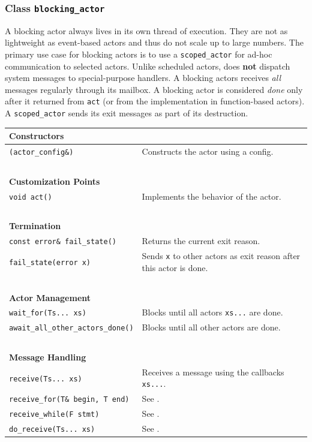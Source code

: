 \clearpage
\subsubsection{Class \lstinline^blocking_actor^}

A blocking actor always lives in its own thread of execution. They are not as lightweight as event-based actors and thus do not scale up to large numbers. The primary use case for blocking actors is to use a \lstinline^scoped_actor^ for ad-hoc communication to selected actors. Unlike scheduled actors, \lib does \textbf{not} dispatch system messages to special-purpose handlers. A blocking actors receives \emph{all} messages regularly through its mailbox. A blocking actor is considered \emph{done} only after it returned from \lstinline^act^ (or from the implementation in function-based actors). A \lstinline^scoped_actor^ sends its exit messages as part of its destruction.

\begin{center}
\small
\begin{tabular}{ll}
  \textbf{Constructors} & ~ \\
  \hline
  \lstinline^(actor_config&)^ & Constructs the actor using a config. \\
  \hline
  ~ & ~ \\ \textbf{Customization Points} & ~ \\
  \hline
  \lstinline^void act()^ & Implements the behavior of the actor. \\
  \hline
  ~ & ~ \\ \textbf{Termination} & ~ \\
  \hline
  \lstinline^const error& fail_state()^ & Returns the current exit reason. \\
  \hline
  \lstinline^fail_state(error x)^ & Sends \lstinline^x^ to other actors as exit reason after this actor is done. \\
  \hline
  ~ & ~ \\ \textbf{Actor Management} & ~ \\
  \hline
  \lstinline^wait_for(Ts... xs)^ & Blocks until all actors \lstinline^xs...^ are done. \\
  \hline
  \lstinline^await_all_other_actors_done()^ & Blocks until all other actors are done. \\
  \hline
  ~ & ~ \\ \textbf{Message Handling} & ~ \\
  \hline
  \lstinline^receive(Ts... xs)^ & Receives a message using the callbacks \lstinline^xs...^. \\
  \hline
  \lstinline^receive_for(T& begin, T end)^ & See . \\
  \hline
  \lstinline^receive_while(F stmt)^ & See . \\
  \hline
  \lstinline^do_receive(Ts... xs)^ & See . \\
  \hline
\end{tabular}
\end{center}

